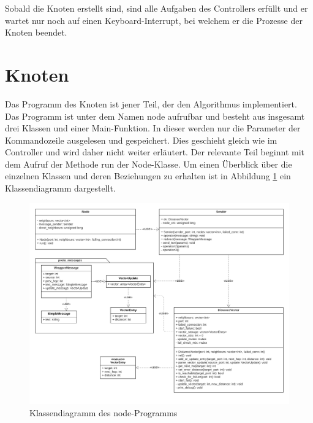 Sobald die Knoten erstellt sind, sind alle Aufgaben des Controllers erfüllt und er wartet nur noch auf einen Keyboard-Interrupt, bei welchem er die Prozesse der Knoten beendet.

\section{Knoten}
Das Programm des Knoten ist jener Teil, der den Algorithmus implementiert. Das Programm ist unter dem Namen node aufrufbar und besteht aus insgesamt drei Klassen und einer Main-Funktion. In dieser werden nur die Parameter der Kommandozeile ausgelesen und gespeichert. Dies geschieht gleich wie im Controller und wird daher nicht weiter erläutert. Der relevante Teil beginnt mit dem Aufruf der Methode run der Node-Klasse. Um einen Überblick über die einzelnen Klassen und deren Beziehungen zu erhalten ist in Abbildung \ref{fig:class_diag} ein Klassendiagramm dargestellt.

\begin{figure}
    \centering
    \includegraphics[width=\textwidth]{images/nvs_class_diag.png}
    \caption{Klassendiagramm des node-Programms}
    \label{fig:class_diag}
\end{figure}


